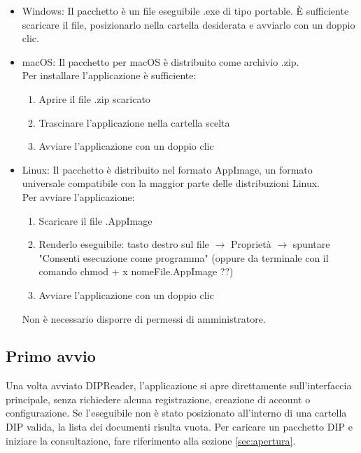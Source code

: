 \documentclass[a4paper,12pt]{article}
\begin{document}
            \begin{itemize}
                \item Windows: Il pacchetto è un file eseguibile .exe di tipo portable. È sufficiente scaricare il file, posizionarlo nella cartella desiderata e avviarlo con un doppio clic.
                \item macOS: Il pacchetto per macOS è distribuito come archivio .zip. \\
                    Per installare l'applicazione è sufficiente:
                    \begin{enumerate}
                        \item Aprire il file .zip scaricato
                        \item Trascinare l'applicazione nella cartella scelta
                        \item Avviare l'applicazione con un doppio clic
                    \end{enumerate}
                \item Linux: Il pacchetto è distribuito nel formato AppImage, un formato universale compatibile con la maggior parte delle distribuzioni Linux. \\
                    Per avviare l'applicazione:
                    \begin{enumerate}
                        \item Scaricare il file .AppImage
                        \item Renderlo eseguibile: tasto destro sul file $\rightarrow$ Proprietà $\rightarrow$ spuntare "Consenti esecuzione come programma" (oppure da terminale con il comando chmod + x nomeFile.AppImage ??)
                        \item Avviare l'applicazione con un doppio clic
                    \end{enumerate}
                    Non è necessario disporre di permessi di amministratore.
            \end{itemize}

        \subsection{Primo avvio}
            Una volta avviato DIPReader, l'applicazione si apre direttamente sull'interfaccia principale, senza richiedere alcuna registrazione, creazione di account o configurazione. Se l'eseguibile non è stato posizionato all'interno di una cartella DIP valida, la lista dei documenti risulta vuota.
            Per caricare un pacchetto DIP e iniziare la consultazione, fare riferimento alla sezione \ref{sec:apertura}.
\end{document}
